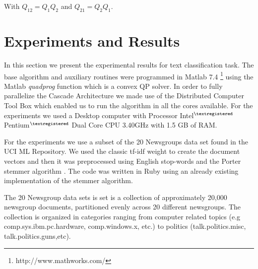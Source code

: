 With $Q_{12}=Q_{1}Q_{2}$ and $Q_{21}=Q_{2}Q_{1}$. 


\section{Experiments and Results}

In this section we present the experimental results for text classification
task. The base algorithm and auxiliary routines were programmed in
Matlab 7.4%
\footnote{http://www.mathworks.com/%
} using the Matlab \emph{quadprog} function which is a convex QP solver.
In order to fully parallelize the Cascade Architecture we made use
of the Distributed Computer Tool Box which enabled us to run the algorithm
in all the cores available. For the experiments we used a Desktop
computer with Processor Intel$^{\textregistered}$ Pentium$^{\textregistered}$
Dual Core CPU 3.40GHz with 1.5 GB of RAM.

For the experiments we use a subset of the 20 Newsgroups \cite{20news}
data set found in the UCI ML Repository\cite{Asuncion+Newman:2007}.
We used the classic tf-idf weight to create the document vectors
\cite{361220,866292} and then it was preprocessed using English stop-words
and the Porter stemmer algorithm \cite{Porter80}. The code was written
in Ruby using an already existing implementation of the stemmer algorithm. 

The 20 Newsgroup data sets is set is a collection of approximately
20,000 newsgroup documents, partitioned evenly across 20 different
newsgroups. The collection is organized in categories ranging from computer
related topics (e.g comp.sys.ibm.pc.hardware, comp.windows.x, etc.) to
politics (talk.politics.misc,  talk.politics.guns,etc).

